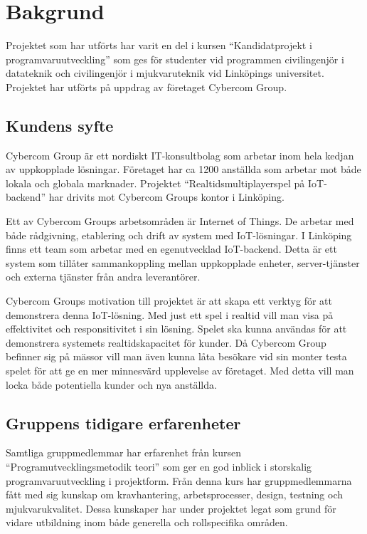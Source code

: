 \chapter{Bakgrund}
\label{cha:background}
Projektet som har utförts har varit en del i kursen ``Kandidatprojekt i programvaruutveckling'' som ges för studenter vid programmen civilingenjör i datateknik och civilingenjör i mjukvaruteknik vid Linköpings universitet.\cite{tddd96} Projektet har utförts på uppdrag av företaget Cybercom Group.

\section{Kundens syfte}
\label{sec:customer-aim}
Cybercom Group är ett nordiskt IT-konsultbolag som arbetar inom hela kedjan av uppkopplade lösningar. Företaget har ca 1200 anställda som arbetar mot både lokala och globala marknader.\cite{cybercomgroup} Projektet ``Realtidsmultiplayerspel på IoT-backend'' har drivits mot Cybercom Groups kontor i Linköping.

Ett av Cybercom Groups arbetsområden är Internet of Things. De arbetar med både rådgivning, etablering och drift av system med IoT-lösningar.\cite{cybercomiot} I Linköping finns ett team som arbetar med en egenutvecklad IoT-backend. Detta är ett system som tillåter sammankoppling mellan uppkopplade enheter, server-tjänster och externa tjänster från andra leverantörer.

Cybercom Groups motivation till projektet är att skapa ett verktyg för att demonstrera denna IoT-lösning. Med just ett spel i realtid vill man visa på effektivitet och responsitivitet i sin lösning. Spelet ska kunna användas för att demonstrera systemets realtidskapacitet för kunder. Då Cybercom Group befinner sig på mässor vill man även kunna låta besökare vid sin monter testa spelet för att ge en mer minnesvärd upplevelse av företaget. Med detta vill man locka både potentiella kunder och nya anställda.

\section{Gruppens tidigare erfarenheter}
\label{sec:earlier-experience}
Samtliga gruppmedlemmar har erfarenhet från kursen ``Programutvecklingsmetodik teori'' som ger en god inblick i storskalig programvaruutveckling i projektform. Från denna kurs har gruppmedlemmarna fått med sig kunskap om kravhantering, arbetsprocesser, design, testning och mjukvarukvalitet.\cite{tddc93} Dessa kunskaper har under projektet legat som grund för vidare utbildning inom både generella och rollspecifika områden.

